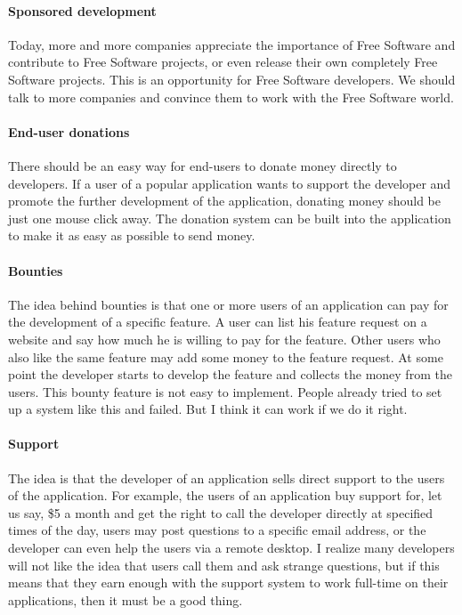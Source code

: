 \paragraph*{Sponsored development}

Today, more and more companies appreciate the importance of Free Software and
contribute to Free Software projects, or even release their own completely Free
Software projects. This is an opportunity for Free Software developers. We
should talk to more companies and convince them to work with the Free Software
world. 

\paragraph*{End-user donations}

There should be an easy way for end-users to donate money directly to
developers. If a user of a popular application wants to support the developer
and promote the further development of the application, donating money should be
just one mouse click away. The donation system can be built into the application
to make it as easy as possible to send money.

\paragraph*{Bounties}

The idea behind bounties is that one or more users of an application can pay for
the development of a specific feature. A user can list his feature request on a
website and say how much he is willing to pay for the feature. Other users who
also like the same feature may add some money to the feature request. At some
point the developer starts to develop the feature and collects the money from
the users. This bounty feature is not easy to implement. People already tried to
set up a system like this and failed. But I think it can work if we do it
right. 

\paragraph*{Support}

The idea is that the developer of an application sells direct support to the
users of the application. For example, the users of an application buy support
for, let us say, \$5 a month and get the right to call the developer directly at
specified times of the day, users may post questions to a specific email
address, or the developer can even help the users via a remote desktop. I
realize many developers will not like the idea that users call them and ask
strange questions, but if this means that they earn enough with the support
system to work full-time on their applications, then it must be a good thing.

